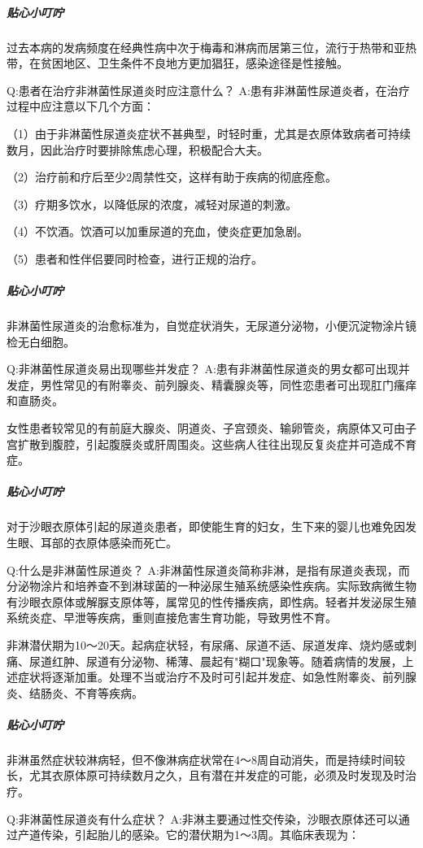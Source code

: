 \documentclass[12pt,UTF8]{ctexbook}
\begin{document}
\subparagraph{贴心小叮咛}

过去本病的发病频度在经典性病中次于梅毒和淋病而居第三位，流行于热带和亚热带，在贫困地区、卫生条件不良地方更加猖狂，感染途径是性接触。

Q:患者在治疗非淋菌性尿道炎时应注意什么？
A:患有非淋菌性尿道炎者，在治疗过程中应注意以下几个方面：

（1）由于非淋菌性尿道炎症状不甚典型，时轻时重，尤其是衣原体致病者可持续数月，因此治疗时要排除焦虑心理，积极配合大夫。

（2）治疗前和疗后至少2周禁性交，这样有助于疾病的彻底痊愈。

（3）疗期多饮水，以降低尿的浓度，减轻对尿道的刺激。

（4）不饮酒。饮酒可以加重尿道的充血，使炎症更加急剧。

（5）患者和性伴侣要同时检查，进行正规的治疗。

\subparagraph{贴心小叮咛}

非淋菌性尿道炎的治愈标准为，自觉症状消失，无尿道分泌物，小便沉淀物涂片镜检无白细胞。

Q:非淋菌性尿道炎易出现哪些并发症？
A:患有非淋菌性尿道炎的男女都可出现并发症，男性常见的有附睾炎、前列腺炎、精囊腺炎等，同性恋患者可出现肛门瘙痒和直肠炎。

女性患者较常见的有前庭大腺炎、阴道炎、子宫颈炎、输卵管炎，病原体又可由子宫扩散到腹腔，引起腹膜炎或肝周围炎。这些病人往往出现反复炎症并可造成不育症。

\subparagraph{贴心小叮咛}

对于沙眼衣原体引起的尿道炎患者，即使能生育的妇女，生下来的婴儿也难免因发生眼、耳部的衣原体感染而死亡。

Q:什么是非淋菌性尿道炎？
A:非淋菌性尿道炎简称非淋，是指有尿道炎表现，而分泌物涂片和培养查不到淋球菌的一种泌尿生殖系统感染性疾病。实际致病微生物有沙眼衣原体或解脲支原体等，属常见的性传播疾病，即性病。轻者并发泌尿生殖系统炎症、早泄等疾病，重则直接危害生育功能，导致男性不育。

非淋潜伏期为10～20天。起病症状轻，有尿痛、尿道不适、尿道发痒、烧灼感或刺痛、尿道红肿、尿道有分泌物、稀薄、晨起有"糊口"现象等。随着病情的发展，上述症状将逐渐加重。处理不当或治疗不及时可引起并发症、如急性附睾炎、前列腺炎、结肠炎、不育等疾病。

\subparagraph{贴心小叮咛}

非淋虽然症状较淋病轻，但不像淋病症状常在4～8周自动消失，而是持续时间较长，尤其衣原体原可持续数月之久，且有潜在并发症的可能，必须及时发现及时治疗。

Q:非淋菌性尿道炎有什么症状？
A:非淋主要通过性交传染，沙眼衣原体还可以通过产道传染，引起胎儿的感染。它的潜伏期为1～3周。其临床表现为：
\end{document}
